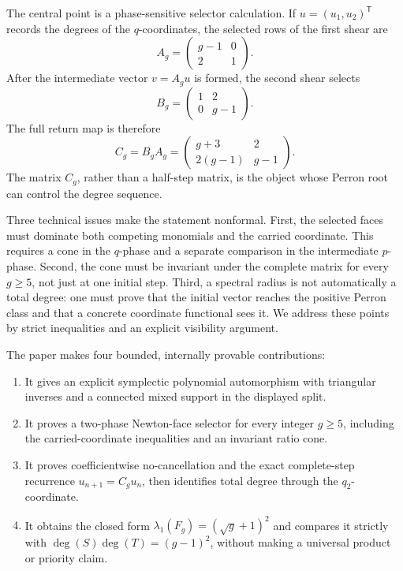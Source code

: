 \documentclass[11pt]{article}
\theoremstyle{remark}
\numberwithin{equation}{section}
\begin{document}
The central point is a phase-sensitive selector calculation.  If
\(u=(u_1,u_2)^{\mathsf T}\) records the degrees of the \(q\)-coordinates, the
selected rows of the first shear are
\[
 A_g=\begin{pmatrix}g-1&0\\2&1\end{pmatrix}.
\]
After the intermediate vector \(v=A_gu\) is formed, the second shear selects
\[
 B_g=\begin{pmatrix}1&2\\0&g-1\end{pmatrix}.
\]
The full return map is therefore
\[
 C_g=B_gA_g=
 \begin{pmatrix}g+3&2\\2(g-1)&g-1\end{pmatrix}.
\]
The matrix \(C_g\), rather than a half-step matrix, is the object whose Perron
root can control the degree sequence.

Three technical issues make the statement nonformal.  First, the selected
faces must dominate both competing monomials and the carried coordinate.  This
requires a cone in the \(q\)-phase and a separate comparison in the
intermediate \(p\)-phase.  Second, the cone must be invariant under the
complete matrix for every \(g\geq5\), not just at one initial step.  Third, a
spectral radius is not automatically a total degree: one must prove that the
initial vector reaches the positive Perron class and that a concrete coordinate
functional sees it.  We address these points by strict inequalities and an
explicit visibility argument.

The paper makes four bounded, internally provable contributions:
\begin{enumerate}
\item It gives an explicit symplectic polynomial automorphism with triangular
  inverses and a connected mixed support in the displayed split.
\item It proves a two-phase Newton-face selector for every integer \(g\geq5\),
  including the carried-coordinate inequalities and an invariant ratio cone.
\item It proves coefficientwise no-cancellation and the exact complete-step
  recurrence \(u_{n+1}=C_gu_n\), then identifies total degree through the
  \(q_2\)-coordinate.
\item It obtains the closed form
  \(\lambda_1(F_g)=(\sqrt g+1)^2\) and compares it strictly with
  \(\deg(S)\deg(T)=(g-1)^2\), without making a universal product or priority
  claim.
\end{enumerate}
\end{document}
